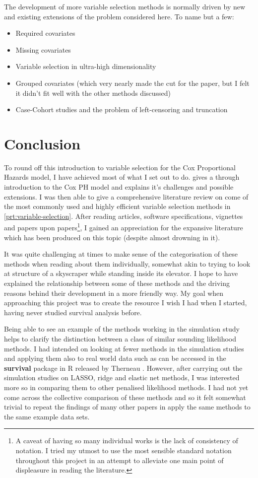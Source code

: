 The development of more variable selection methods is normally driven by new and existing extensions of the problem considered here. To name but a few:

\begin{itemize}
    \item Required covariates
    \item Missing covariates
    \item Variable selection in ultra-high dimensionality
    \item Grouped covariates (which very nearly made the cut for the paper, but I felt it didn't fit well with the other methods discussed)
    \item Case-Cohort studies and the problem of left-censoring and truncation
\end{itemize}

\section{Conclusion}

To round off this introduction to variable selection for the Cox Proportional Hazards model, I have achieved most of what I set out to do.  gives a through introduction to the Cox PH model and explains it's challenges and possible extensions. I was then able to give a comprehensive literature review on come of the most commonly used and highly efficient variable selection methods in \cref{prt:variable-selection}. After reading articles, software specifications, vignettes and papers upon papers\footnote{A caveat of having so many individual works is the lack of consistency of notation. I tried my utmost to use the most sensible standard notation throughout this project in an attempt to alleviate one main point of displeasure in reading the literature.}, I gained an appreciation for the expansive literature which has been produced on this topic (despite almost drowning in it). 

It was quite challenging at times to make sense of the categorisation of these methods when reading about them individually, somewhat akin to trying to look at structure of a skyscraper while standing inside its elevator. I hope to have explained the relationship between some of these methods and the driving reasons behind their development in a more friendly way. My goal when approaching this project was to create the resource I wish I had when I started, having never studied survival analysis before.

Being able to see an example of the methods working in the simulation study helps to clarify the distinction between a class of similar sounding likelihood methods. I had intended on looking at fewer methods in the simulation studies and applying them also to real world data such as can be accessed in the \textbf{survival} package in R released by Therneau . However, after carrying out the simulation studies on LASSO, ridge and elastic net methods, I was interested more so in comparing them to other penalised likelihood methods. I had not yet come across the collective comparison of these methods and so it felt somewhat trivial to repeat the findings of many other papers in apply the same methods to the same example data sets. 

